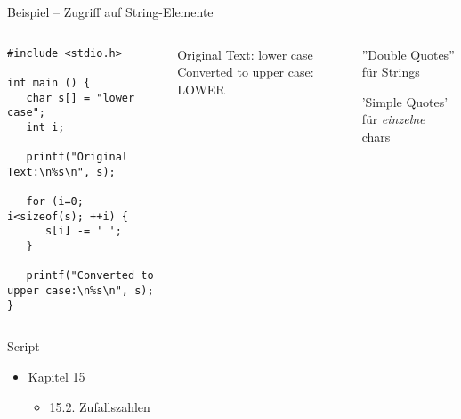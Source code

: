 
\begin{frame}[fragile]{Beispiel -- Zugriff auf String-Elemente}
%
\begin{columns}[T]
\begin{codebox}
\begin{verbatim}
#include <stdio.h>

int main () {
   char s[] = "lower case";
   int i;

   printf("Original Text:\n%s\n", s);
   
   for (i=0; i<sizeof(s); ++i) {
      s[i] -= ' ';
   }

   printf("Converted to upper case:\n%s\n", s);
}
\end{verbatim}
\end{codebox}
%
\begin{cmdbox}[Ausgabe]
\ttfamily \footnotesize
Original Text:\newline
lower case\newline
Converted to upper case:\newline
LOWER
\end{cmdbox}
%
\begin{warnbox}
''Double Quotes'' für Strings

'Simple Quotes' für \emph{einzelne} chars
\end{warnbox}
\end{columns}
%
\end{frame}


\begin{frame}{Script}
%
\begin{itemize}
\item Kapitel 15
	\begin{itemize}
	\item 15.2. Zufallszahlen
	\end{itemize}
\end{itemize}
%
\end{frame}



